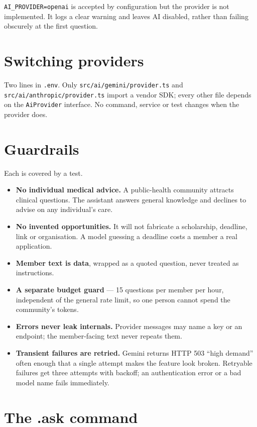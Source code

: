 \documentclass[11pt,a4paper]{report}
\newcommand{\dash}{---}
\begin{document}
\texttt{AI\_PROVIDER=openai} is accepted by configuration but the provider is
not implemented. It logs a clear warning and leaves AI disabled, rather than
failing obscurely at the first question.

\section{Switching providers}

Two lines in \texttt{.env}. Only
\texttt{src/ai/gemini/provider.ts} and \texttt{src/ai/anthropic/provider.ts}
import a vendor SDK; every other file depends on the \texttt{AiProvider}
interface. No command, service or test changes when the provider does.

\section{Guardrails}

Each is covered by a test.

\begin{itemize}
  \item \textbf{No individual medical advice.} A public-health community
        attracts clinical questions. The assistant answers general knowledge
        and declines to advise on any individual's care.
  \item \textbf{No invented opportunities.} It will not fabricate a
        scholarship, deadline, link or organisation. A model guessing a
        deadline costs a member a real application.
  \item \textbf{Member text is data}, wrapped as a quoted question, never
        treated as instructions.
  \item \textbf{A separate budget guard} \dash{} 15 questions per member per
        hour, independent of the general rate limit, so one person cannot
        spend the community's tokens.
  \item \textbf{Errors never leak internals.} Provider messages may name a key
        or an endpoint; the member-facing text never repeats them.
  \item \textbf{Transient failures are retried.} Gemini returns HTTP 503
        ``high demand'' often enough that a single attempt makes the feature
        look broken. Retryable failures get three attempts with backoff;
        an authentication error or a bad model name fails immediately.
\end{itemize}

\section{The .ask command}
\end{document}
